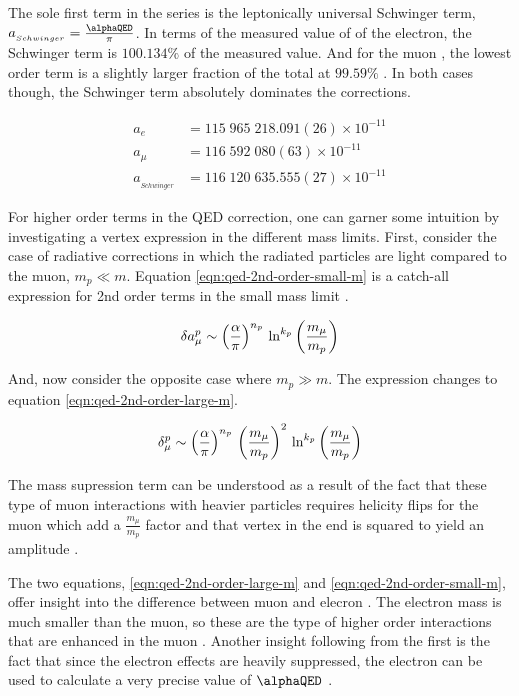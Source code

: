 \noindent
The sole first term in the series is the leptonically universal Schwinger term, $a_{_{Schwinger}} = \frac{\alphaQED}{\pi}$.  In terms of the measured value of \gmtwo of the electron, the Schwinger term is $100.134\%$ of the measured value. And for the muon \gmtwo, the lowest order term is a slightly larger fraction of the total at $99.59\%$ \cite{codata}.  In both cases though, the Schwinger term absolutely dominates the corrections.

\begin{align*}
a_{e}   & = 115\;965\;218.091(26) \times 10^{-11} \\
a_{\mu} & = 116\;592\;080(63) \times 10^{-11} \\
a_{_{Schwinger}} & = 116\;120\;635.555(27) \times 10^{-11}
\end{align*}

For higher order terms in the QED correction, one can garner some intuition by investigating a vertex expression in the different mass limits.  First, consider the case of radiative corrections in which the radiated particles are light compared to the muon, $m_p \ll m$.  Equation \ref{eqn:qed-2nd-order-small-m} is a catch-all expression for 2nd order terms in the small mass limit \cite{the-muon-g-2}.

\begin{equation}
\label{eqn:qed-2nd-order-small-m}
\delta a_\mu^p \sim \left(\frac{\alpha}{\pi} \right)^{n_p} \\
\ln^{k_p} \left( \frac{m_\mu}{m_p} \right)
\end{equation}

\noindent
And, now consider the opposite case where $m_p \gg m$.  The expression changes to equation \ref{eqn:qed-2nd-order-large-m}.

\begin{equation}
\label{eqn:qed-2nd-order-large-m}
\delta_\mu^p \sim \left( \frac{\alpha}{\pi} \right)^{n_p} \\
\left( \frac{m_\mu}{m_p} \right)^2 \\
\ln^{k_p} \left( \frac{m_\mu}{m_p} \right)
\end{equation}

\noindent
The mass supression term can be understood as a result of the fact that these type of muon interactions with heavier particles requires helicity flips for the muon which add a $\frac{m_\mu}{m_p}$ factor and that vertex in the end is squared to yield an amplitude \cite{amm-of-muon}.

The two equations, \ref{eqn:qed-2nd-order-large-m} and \ref{eqn:qed-2nd-order-small-m}, offer insight into the difference between muon and elecron \gmtwo.  The electron mass is much smaller than the muon, so these are the type of higher order interactions that are enhanced in the muon \gmtwo.  Another insight following from the first is the fact that since the electron effects are heavily suppressed, the electron \gmtwo can be used to calculate a very precise value of $\alphaQED$ \cite{amm-of-muon}.

